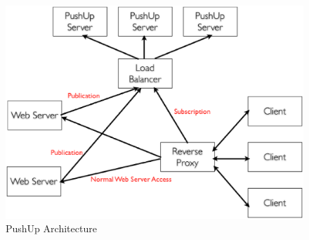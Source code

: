 \begin{figure}[htb!]
\centering%
    \includegraphics[scale=0.30]{figures/pushup.eps}
    \caption{PushUp Architecture}
    \label{fig:architecture}
\end{figure}

